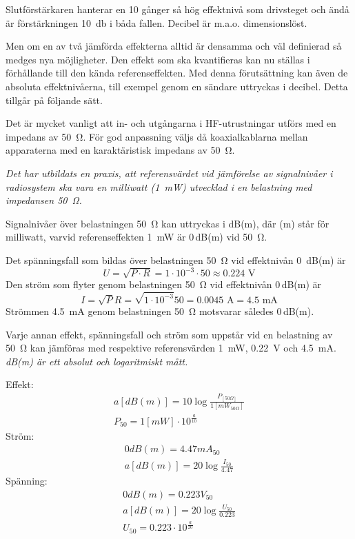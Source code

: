 Slutförstärkaren hanterar en 10 gånger så hög effektnivå som drivsteget och ändå
är förstärkningen \SI{10}{\decibel} i båda fallen.
Decibel är m.a.o. dimensionslöst.

Men om en av två jämförda effekterna alltid är densamma och väl
definierad så medges nya möjligheter. Den effekt som ska
kvantifieras kan nu ställas i förhållande till den kända
referenseffekten. Med denna förutsättning kan även de absoluta
effektnivåerna, till exempel genom en sändare uttryckas i decibel. Detta
tillgår på följande sätt.

Det är mycket vanligt att in- och utgångarna i HF-utrustningar utförs
med en impedans av \SI{50}{\ohm}.
För god anpassning väljs då koaxialkablarna mellan apparaterna med en
karaktäristisk impedans av \SI{50}{\ohm}.

\emph{Det har utbildats en praxis, att referensvärdet vid jämförelse
  av signalnivåer i radiosystem ska vara en milliwatt (1~mW)
  utvecklad i en belastning med impedansen \SI{50}{\ohm}.}

Signalnivåer över belastningen \SI{50}{\ohm} kan uttryckas i dB(m), där (m)
står för milliwatt, varvid referenseffekten \SI{1}{\milli\watt} är 0\,dB(m) vid
\SI{50}{\ohm}.

Det spänningsfall som bildas över belastningen \SI{50}{\ohm} vid effektnivån
0~dB(m) är
\[U = \sqrt{P\cdot R} = 1\cdot 10^{-3} \cdot 50 \approx 0.224 \text{ V}\]
Den ström som flyter genom belastningen \SI{50}{\ohm} vid effektnivån 0\,dB(m)
är
\[
I = \sqrt{P}{R} = \sqrt{1\cdot 10^{-3}}{50} = 0.0045 \text{ A} = 4.5 \text{ mA}
\]
Strömmen \SI{4,5}{\milli\ampere} genom belastningen \SI{50}{\ohm} motsvarar
således 0\,dB(m).

Varje annan effekt, spänningsfall och ström som uppstår vid en belastning av
\SI{50}{\ohm} kan jämföras med respektive referensvärden \SI{1}{\milli\watt},
\SI{0,22}{\volt} och \SI{4,5}{\milli\ampere}.
\emph{dB(m) är ett absolut och logaritmiskt mått.}

\noindent
Effekt:
\begin{gather*}
  a [dB(m)] = 10 \log\frac{P_{[50\Omega]}}{1[mW_{50\Omega}]} \\
  P_{50} = 1 [mW] \cdot 10^{\frac{a}{10}}
\end{gather*}
Ström:
\begin{gather*}
  0 dB(m) = 4.47 mA_{50} \\
  a [dB(m)] = 20 \log\frac{I_{50}}{4.47}
\end{gather*}
Spänning:
\begin{gather*}
  0 dB(m) = 0.223 V_{50} \\
  a [dB(m)] = 20 \log\frac{U_{50}}{0.223} \\
  U_{50} = 0.223 \cdot 10^{\frac{a}{20}}
\end{gather*}

